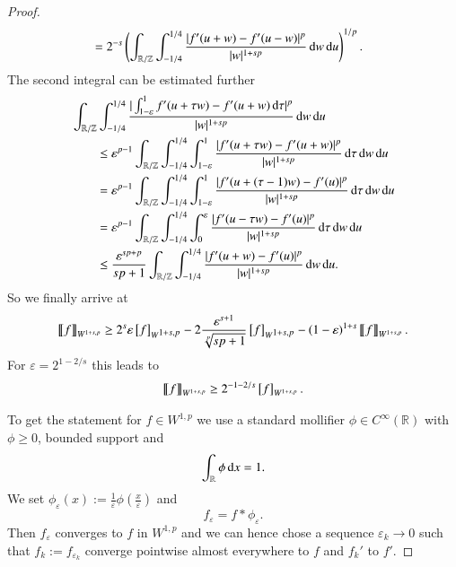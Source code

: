 \begin{proof}
\begin{align*}
 &= 2^{-s} \left(  \int_{\mathbb R / \mathbb Z} \int_{-1/4}^{1/4} 
    \frac{|f'(u+ w) - f'(u- w) |^p}{|w|^{1+sp}} \d w\d u
    \right)^{1/p} .
\end{align*}
The second integral can be estimated further
\begin{align*}
   &\int_{\mathbb R / \mathbb Z} \int_{-1/4}^{1/4} 
    \frac{|\int_{1-\varepsilon}^1 f'(u+ \tau w) - f'(u+w) \d\tau|^p}{|w|^{1+sp}} \d w\d u
   \\
   &
   \qquad\leq \varepsilon^{p-1} \int_{\mathbb R / \mathbb Z} \int_{-1/4}^{1/4} \int_{1-\varepsilon}^1
    \frac{| f'(u+ \tau w) - f'(u+w) |^p}{|w|^{1+sp}} \d\tau \d w\d u
   \\
   & 
   \qquad = \varepsilon^{p-1} \int_{\mathbb R / \mathbb Z} \int_{-1/4}^{1/4} \int_{1-\varepsilon}^1
    \frac{| f'(u+ (\tau-1) w) - f'(u) |^p}{|w|^{1+sp}} \d\tau \d w\d u
   \\
   &
   \qquad =  \varepsilon^{p-1}\int_{\mathbb R / \mathbb Z} \int_{-1/4}^{1/4} \int_{0}^{\varepsilon}
    \frac{| f'(u- \tau w) - f'(u) |^p}{|w|^{1+sp}} \d\tau \d w\d u
   \\
   &\qquad\leq \frac {\varepsilon^{sp+p}} {sp+1} \int_{\mathbb R / \mathbb Z} \int_{-1/4}^{1/4}
    \frac{| f'(u+ w) - f'(u) |^p}{|w|^{1+sp}} \d w\d u.
\end{align*}
So we finally arrive at
\begin{align*}
 \seminormv f_{W^{1+s,p}} \geq
 2^{s} \varepsilon \seminorm f_{\W[1+s,p]}
   -2\frac {\varepsilon^{s+1}}{\sqrt[p]{sp+1}} \seminorm f_{\W[1+s,p]}
-(1-\varepsilon)^{1+s} \seminormv f_{W^{1+s,p}}.
\end{align*}
For $\varepsilon = 2^{1-2/s}$ this leads to
\begin{equation*}
 \seminormv f_{W^{1+s,p}} \geq 2^{-1-2/s} \seminorm f_{W^{1+s,p}}.
\end{equation*}

To get the statement for $f\in W^{1,p}$ we use a standard mollifier $\phi \in C^{\infty}(\mathbb R)$
with $\phi\ge0$, bounded support and
$$
 \int_{\mathbb R} \phi \d x = 1.
$$
We set $\phi_{\varepsilon} (x):= \frac 1 \varepsilon \phi(\frac x \varepsilon)$ and
$$
  f_\varepsilon = f \ast \phi_{\varepsilon}.
$$
Then $f_\varepsilon$ converges to $f$ in $W^{1,p}$ and we can hence chose a sequence $\varepsilon_k \rightarrow 0$
such that
$
  f_k := f_{\varepsilon_k}
$
converge pointwise almost everywhere to $f$ and $f_k'$ to $f'$.


\end{proof}
